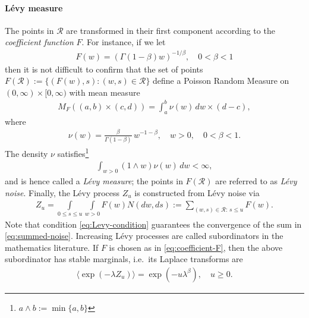 \documentclass[a4paper,12pt]{elsarticle}
\numberwithin{equation}{section}
\theoremstyle{plain}
\theoremstyle{definition}
\theoremstyle{remark}
\numberwithin{equation}{section}
\newcommand{\1}{\mathbf 1}
\begin{document}
\paragraph{L\'evy measure}
The points in $\mathcal R$ are transformed in their first component according 
to the \emph{coefficient function} $F$.  For instance, if we let 
\begin{align} \label{eq:coefficient-F}
  F(w) = \left( \Gamma(1-\beta) w \right)^{-1/\beta}, \quad 0 < \beta < 1
\end{align}
then it is not difficult to confirm that the set of points 
$F(\mathcal R) := \{(F(w), s): (w,s) \in \mathcal R\}$ 
define a Poisson Random Measure on $(0,\infty) \times [0,\infty)$ with mean 
measure 
\begin{align}
  M_F((a,b) \times (c,d)) = \int_a^b \nu(w)\,dw \times (d-c),
\end{align}
where 
\begin{align} \label{eq:stable-levy-measure}
\nu(w) = \frac{\beta}{\Gamma(1-\beta)} \, w^{-1-\beta}, \quad w > 0, \quad 
0 < \beta < 1.
\end{align}
The density $\nu$ satisfies\footnote{$a \wedge b := \min\{a, b\}$}
\begin{align}
\label{eq:Levy-condition}
\int_{w > 0}(1 \wedge w) \nu(w)\,dw < \infty,  
\end{align}
and is hence called a \emph{L\'evy measure};
the points in $F(\mathcal R)$ are referred to as \emph{L\'evy noise}.
Finally, the L\'evy process $Z_u$ is constructed from L\'evy noise via 
\begin{align} \label{eq:summed-noise}
  Z_u = \int\limits_{0 \le s \le u} \int\limits_{w > 0} F(w) N(dw,ds)
  := \sum_{(w,s) \in \mathcal R:\, s \le u} F(w).
\end{align}
Note that condition \eqref{eq:Levy-condition} guarantees the convergence of the 
sum in \eqref{eq:summed-noise}. 
Increasing L\'evy processes are called subordinators in the mathematics
literature.  If $F$ is chosen as in \eqref{eq:coefficient-F}, then the above 
subordinator has stable marginals, i.e.\ its Laplace 
transforms are \cite{Bertoin04}
\begin{align}
  \langle \exp(-\lambda Z_u) \rangle = \exp(-u \lambda^\beta), \quad u \ge 0.
\end{align}
 
\end{document}
